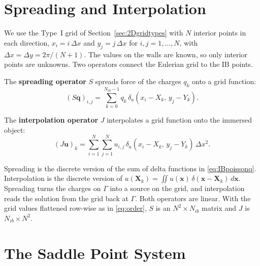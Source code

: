 \section{Spreading and Interpolation}
\label{sec:IBspreadinterp}

We use the Type~I grid of Section~\ref{sec:2Dgridtypes} with $N$ interior
points in each direction, $x_i = i\,\Delta x$ and $y_j = j\,\Delta x$ for
$i, j = 1, \dots, N$, with $\Delta x = \Delta y = 2\pi/(N+1)$. The values on
the walls are known, so only interior points are unknowns. Two operators
connect the Eulerian grid to the IB points.

\begin{definition}
The \textbf{spreading operator} $S$ spreads force of the charges $q_k$ onto a grid
function:
\begin{equation}
  (S\mathbf{q})_{i,j} = \sum_{k=0}^{N_{ib}-1} q_k\,
  \delta_a(x_i - X_k,\, y_j - Y_k).
  \label{eq:IBspread}
\end{equation}
\end{definition}

\begin{definition}
The \textbf{interpolation operator} $J$ interpolates a grid function onto the immersed object:
\begin{equation}
  (J\mathbf{u})_k = \sum_{i=1}^{N}\sum_{j=1}^{N} u_{i,j}\,
  \delta_a(x_i - X_k,\, y_j - Y_k)\,\Delta x^2 .
  \label{eq:IBinterp}
\end{equation}
\end{definition}

Spreading is the discrete version of the sum of delta functions in
\eqref{eq:IBpoissonq}. Interpolation is the discrete version of
$u(\mathbf{X}_k) = \iint u(\mathbf{x})\,\delta(\mathbf{x} - \mathbf{X}_k)\,d\mathbf{x}$. Spreading turns the charges on $\Gamma$ into a source on
the grid, and interpolation reads the solution from the grid back at
$\Gamma$. Both operators are linear. With the grid values
flattened row-wise as in \eqref{eq:order}, $S$ is an $N^2 \times N_{ib}$
matrix and $J$ is $N_{ib} \times N^2$.

\section{The Saddle Point System}
\label{sec:IBsaddle}

